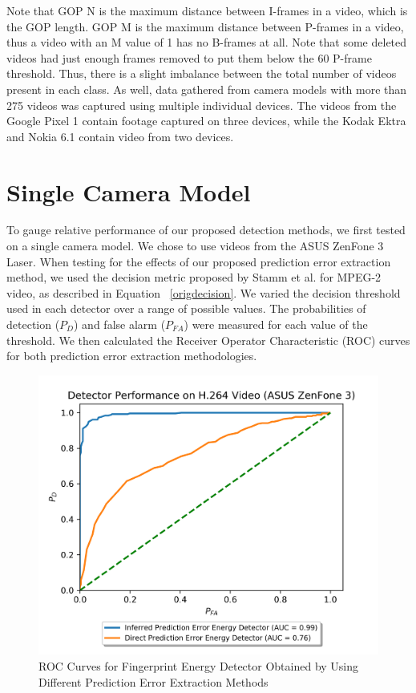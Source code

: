 Note that GOP N is the maximum distance between I-frames in a video, which is the GOP length. GOP M is the maximum distance between P-frames in a video, thus a video with an M value of 1 has no B-frames at all. Note that some deleted videos had just enough frames removed to put them below the 60 P-frame threshold. Thus, there is a slight imbalance between the total number of videos present in each class. As well, data gathered from camera models with more than 275 videos was captured using multiple individual devices. The videos from the Google Pixel 1 contain footage captured on three devices, while the Kodak Ektra and Nokia 6.1 contain video from two devices.

\section{Single Camera Model}

To gauge relative performance of our proposed detection methods, we first tested on a single camera model. We chose to use videos from the ASUS ZenFone 3 Laser. When testing for the effects of our proposed prediction error extraction method, we used the decision metric proposed by Stamm et al. for MPEG-2 video, as described in Equation ~\ref{origdecision}. We varied the decision threshold used in each detector over a range of possible values. The probabilities of detection ($P_{D}$) and false alarm ($P_{FA}$) were measured for each value of the threshold. We then calculated the Receiver Operator Characteristic (ROC) curves for both prediction error extraction methodologies.

\begin{figure}[htbp]
\centerline{\includegraphics[width=0.7\linewidth]{ExperimentalResults/new_perror_extract_roc_asus.png}}
\caption{ROC Curves for Fingerprint Energy Detector Obtained by Using Different Prediction Error Extraction Methods}
\label{perrorExtractASUS}
\end{figure} 

